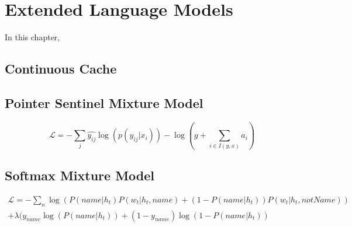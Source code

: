 \chapter{Extended Language Models}

In this chapter, 


\section{Continuous Cache}
\label{sec:continuousCache}

\cite{grave2016improving}

\section{Pointer Sentinel Mixture Model}
\label{sec:pointerMixture}

\cite{merity2016pointer}

\begin{equation}
\mathcal{L}=-\sum_{j} \hat{y_{ij}}\log(p(y_{ij}|x_i)) -\log(g + \sum_{i \in I(y,x)}a_i)
\end{equation}

\section{Softmax Mixture Model}
\label{sec:mixtureModel}

\begin{equation}
	\begin{gathered}
		\mathcal{L}=-\sum_{n} \log(P(name|h_t)P(w_t|h_t, name) + (1-P(name|h_t))P(w_t|h_t, notName)) \\
		+ \lambda(y_{name}\log(P(name|h_t)) + (1 - y_{name})\log(1-P(name|h_t)) \\
	\end{gathered}
\end{equation}

